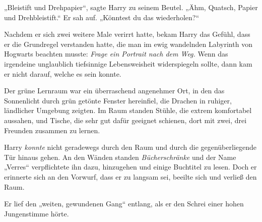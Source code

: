 „Bleistift und Drehpapier“, sagte Harry zu seinem Beutel. „Ähm, Quatsch, Papier und Drehbleistift.“ Er sah auf. „Könntest du das wiederholen?“

Nachdem er sich zwei weitere Male verirrt hatte, bekam Harry das Gefühl, dass er die Grundregel verstanden hatte, die man im ewig wandelnden Labyrinth von Hogwarts beachten musste: \emph{Frage ein Portrait nach dem Weg.} Wenn das irgendeine unglaublich tiefsinnige Lebensweisheit widerspiegeln sollte, dann kam er nicht darauf, welche es sein konnte.

Der grüne Lernraum war ein überraschend angenehmer Ort, in den das Sonnenlicht durch grün getönte Fenster hereinfiel, die Drachen in ruhiger, ländlicher Umgebung zeigten. Im Raum standen Stühle, die extrem komfortabel aussahen, und Tische, die sehr gut dafür geeignet schienen, dort mit zwei, drei Freunden zusammen zu lernen.

Harry \emph{konnte} nicht geradewegs durch den Raum und durch die gegenüberliegende Tür hinaus gehen. An den Wänden standen \emph{Bücherschränke} und der Name „Verres“ verpflichtete ihn dazu, hinzugehen und einige Buchtitel zu lesen. Doch er erinnerte sich an den Vorwurf, dass er zu langsam sei, beeilte sich und verließ den Raum.

Er lief den „weiten, gewundenen Gang“ entlang, als er den Schrei einer hohen Jungenstimme hörte.

